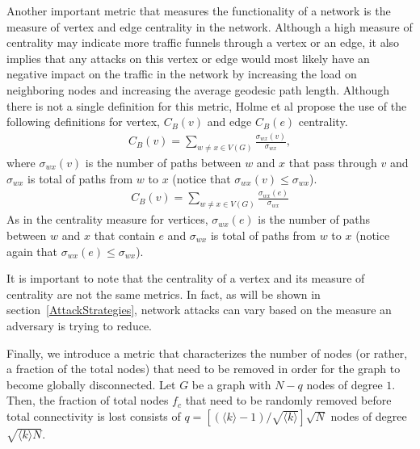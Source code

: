 \documentclass[11pt]{article}
\begin{document}
Another important metric that measures the functionality of a network is the measure of vertex and edge centrality in the network. Although a high measure of centrality may indicate more traffic funnels through a vertex or an edge, it also implies that any attacks on this vertex or edge would most likely have an negative impact on the traffic in the network by increasing the load on neighboring nodes and increasing the average geodesic path length. Although there is not a single definition for this metric, Holme et al \cite{Attacks} propose the use of the following definitions for vertex, $C_{B}(v)$ and edge $C_{B}(e)$ centrality.
\begin{eqnarray*}
C_{B}(v) = \sum_{w \not= x \in V(G)} \frac{\sigma_{wx}(v)}{\sigma_{wx}},
\end{eqnarray*}
where $\sigma_{wx}(v)$ is the number of paths between $w$ and $x$ that pass through $v$ and $\sigma_{wx}$ is total of paths from $w$ to $x$ (notice that $\sigma_{wx}(v) \leq \sigma_{wx}$).
\begin{eqnarray*}
C_{B}(v) = \sum_{w \not= x \in V(G)} \frac{\sigma_{wx}(e)}{\sigma_{wx}}
\end{eqnarray*}
As in the centrality measure for vertices, $\sigma_{wx}(e)$ is the number of paths between $w$ and $x$ that contain $e$ and $\sigma_{wx}$ is total of paths from $w$ to $x$ (notice again that $\sigma_{wx}(e) \leq \sigma_{wx}$).

It is important to note that the centrality of a vertex and its measure of centrality are not the same metrics. In fact, as will be shown in section~\ref{AttackStrategies}, network attacks can vary based on the measure an adversary is trying to reduce. 

Finally, we introduce a metric that characterizes the number of nodes (or rather, a fraction of the total nodes) that need to be removed in order for the graph to become globally disconnected. Let $G$ be a graph with $N - q$ nodes of degree $1$. Then, the fraction of total nodes $f_c$ that need to be randomly removed before total connectivity is lost consists of $q = [(\langle k \rangle - 1) / \sqrt{\langle k \rangle}]\sqrt{N}$ nodes of degree $\sqrt{\langle k \rangle N}$. 


\end{document}
